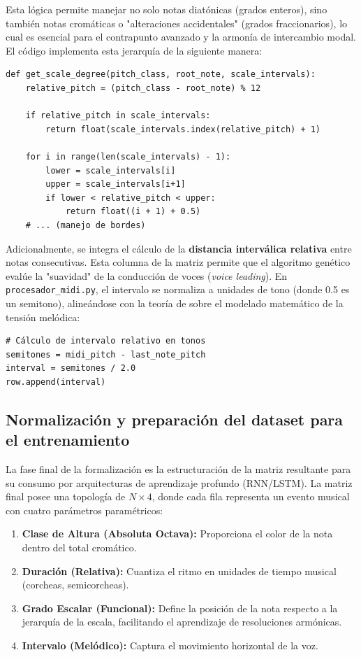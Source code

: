 Esta lógica permite manejar no solo notas diatónicas (grados enteros), sino también notas cromáticas o "alteraciones accidentales" (grados fraccionarios), lo cual es esencial para el contrapunto avanzado y la armonía de intercambio modal. El código implementa esta jerarquía de la siguiente manera:

\begin{verbatim}
def get_scale_degree(pitch_class, root_note, scale_intervals):
    relative_pitch = (pitch_class - root_note) % 12
    
    if relative_pitch in scale_intervals:
        return float(scale_intervals.index(relative_pitch) + 1)
    
    for i in range(len(scale_intervals) - 1):
        lower = scale_intervals[i]
        upper = scale_intervals[i+1]
        if lower < relative_pitch < upper:
            return float((i + 1) + 0.5)
    # ... (manejo de bordes)
\end{verbatim}

Adicionalmente, se integra el cálculo de la \textbf{distancia interválica relativa} entre notas consecutivas. Esta columna de la matriz permite que el algoritmo genético evalúe la "suavidad" de la conducción de voces (\textit{voice leading}). En \texttt{procesador\_midi.py}, el intervalo se normaliza a unidades de tono (donde 0.5 es un semitono), alineándose con la teoría de \cite{chew2014mathematical} sobre el modelado matemático de la tensión melódica:

\begin{verbatim}
# Cálculo de intervalo relativo en tonos
semitones = midi_pitch - last_note_pitch
interval = semitones / 2.0
row.append(interval)
\end{verbatim}

\subsection{Normalización y preparación del dataset para el entrenamiento}

La fase final de la formalización es la estructuración de la matriz resultante para su consumo por arquitecturas de aprendizaje profundo (RNN/LSTM). La matriz final posee una topología de $N \times 4$, donde cada fila representa un evento musical con cuatro parámetros paramétricos:
\begin{enumerate}
    \item \textbf{Clase de Altura (Absoluta Octava):} Proporciona el color de la nota dentro del total cromático.
    \item \textbf{Duración (Relativa):} Cuantiza el ritmo en unidades de tiempo musical (corcheas, semicorcheas).
    \item \textbf{Grado Escalar (Funcional):} Define la posición de la nota respecto a la jerarquía de la escala, facilitando el aprendizaje de resoluciones armónicas.
    \item \textbf{Intervalo (Melódico):} Captura el movimiento horizontal de la voz.
\end{enumerate}

